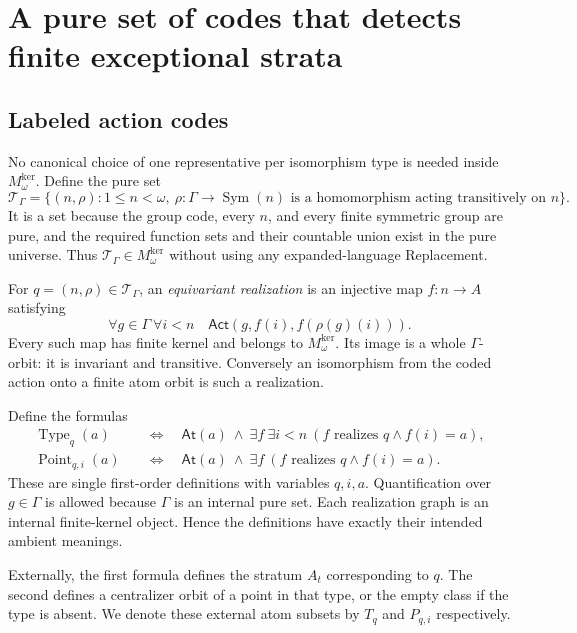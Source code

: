 \documentclass[11pt,letterpaper]{article}
\theoremstyle{definition}
\theoremstyle{remark}
\newcommand{\Mker}{M^{\mathrm{ker}}}
\newcommand{\Sym}{\operatorname{Sym}}
\newcommand{\At}{\mathsf{At}}
\newcommand{\Act}{\mathsf{Act}}
\newcommand{\calT}{\mathcal T_{\Gamma}}
\begin{document}
\section{A pure set of codes that detects finite exceptional strata}
\label{hset:ns:sec:codes}

\subsection{Labeled action codes}
No canonical choice of one representative per isomorphism type is needed inside $\Mker_\omega$. Define the pure set
\begin{equation}\label{hset:ns:eq:codes}
 \calT=\{(n,\rho):1\le n<\omega,\ \rho:\Gamma\to\Sym(n)
   \text{ is a homomorphism acting transitively on }n\}.
\end{equation}
It is a set because the group code, every $n$, and every finite symmetric group are pure, and the required function sets and their countable union exist in the pure universe. Thus $\calT\in \Mker_\omega$ without using any expanded-language Replacement.

For $q=(n,\rho)\in\calT$, an \emph{equivariant realization} is an injective map $f:n\to A$ satisfying
\begin{equation}\label{hset:ns:eq:realization}
 \forall g\in\Gamma\ \forall i<n\quad
 \Act(g,f(i),f(\rho(g)(i))).
\end{equation}
Every such map has finite kernel and belongs to $\Mker_\omega$. Its image is a whole $\Gamma$-orbit: it is invariant and transitive. Conversely an isomorphism from the coded action onto a finite atom orbit is such a realization.

Define the formulas
\begin{align*}
 \operatorname{Type}_q(a)&\quad\Longleftrightarrow\quad
  \At(a)\ \land\ \exists f\ \exists i<n\ (f\text{ realizes }q\land f(i)=a),\\
 \operatorname{Point}_{q,i}(a)&\quad\Longleftrightarrow\quad
  \At(a)\ \land\ \exists f\ (f\text{ realizes }q\land f(i)=a).
\end{align*}
These are single first-order definitions with variables $q,i,a$. Quantification over $g\in\Gamma$ is allowed because $\Gamma$ is an internal pure set. Each realization graph is an internal finite-kernel object. Hence the definitions have exactly their intended ambient meanings.

Externally, the first formula defines the stratum $A_t$ corresponding to $q$. The second defines a centralizer orbit of a point in that type, or the empty class if the type is absent. We denote these external atom subsets by $T_q$ and $P_{q,i}$ respectively.
\end{document}
